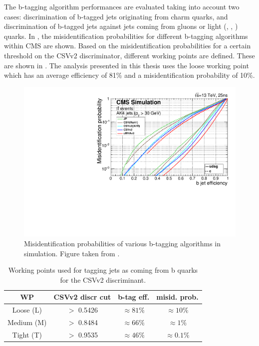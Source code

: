 The b-tagging algorithm performances are evaluated taking into account two cases: discrimination of b-tagged jets originating from charm quarks, and discrimination of b-tagged jets against jets coming from gluons or light (\Pup, \Pdown, \Pstrange) quarks. In , the misidentification probabilities for different b-tagging algorithms within CMS are shown.
Based on the misidentification probabilities for a certain threshold on the CSVv2 discriminator, different working points  are defined. These are shown in . The analysis presented in this thesis uses the loose working point which has an average efficiency of 81\% and a misidentification probability of 10\%. 
\begin{figure}[htbp]
	\centering
	\includegraphics[width=0.7\linewidth]{4_EventRecoSelect/Figures/Figure_008}
	\caption{Misidentification probabilities of various b-tagging algorithms in simulation. Figure taken from \cite{CMS-PAS-BTV-15-001}. }
	\label{fig:figure008}
\end{figure}
\begin{table}[htbp]
	\centering
	\caption{Working points used for tagging jets as coming from b quarks for the CSVv2 discriminant.}
	\begin{tabular}{cccc}
		\toprule
		WP  & CSVv2 discr cut & b-tag eff. & misid. prob. \\ 
		\midrule
		Loose (L) & $>$ 0.5426 & $\approx 81\%$ &  $\approx 10\%$ \\ 
	
		Medium (M)& $>$ 0.8484 & $\approx 66\%$ &  $\approx 1\%$\\ 
		
		Tight (T) & $>$ 0.9535 & $\approx 46\%$ &  $\approx 0.1\%$\\ 
		\bottomrule
	\end{tabular} 
	\label{tab:bctag}	
\end{table}
